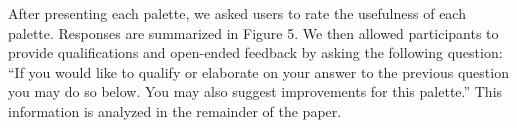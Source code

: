 \documentclass[conference]{IEEEtran}
\begin{document}
After presenting each palette, we asked users to rate the usefulness of each palette. Responses are summarized in Figure 5. We then allowed participants to provide qualifications and open-ended feedback by asking the following question: ``If you would like to qualify or elaborate on your answer to the previous question you may do so below. You may also suggest improvements for this palette.'' This information is analyzed in the remainder of the paper.





\end{document}
